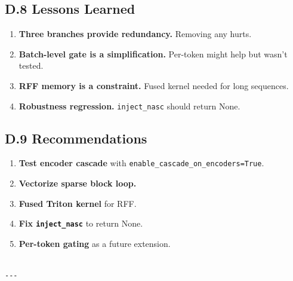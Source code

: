 \subsection{D.8 Lessons Learned}

\begin{enumerate}
\item \textbf{Three branches provide redundancy.} Removing any hurts.
\item \textbf{Batch-level gate is a simplification.} Per-token might help but
  wasn't tested.
\item \textbf{RFF memory is a constraint.} Fused kernel needed for long sequences.
\item \textbf{Robustness regression.} \texttt{inject\_nasc} should return None.

\end{enumerate}
\subsection{D.9 Recommendations}

\begin{enumerate}
\item \textbf{Test encoder cascade} with \texttt{enable\_cascade\_on\_encoders=True}.
\item \textbf{Vectorize sparse block loop.}
\item \textbf{Fused Triton kernel} for RFF.
\item \textbf{Fix \texttt{inject\_nasc}} to return None.
\item \textbf{Per-token gating} as a future extension.
\end{enumerate}
\begin{lstlisting}

---
\end{lstlisting}